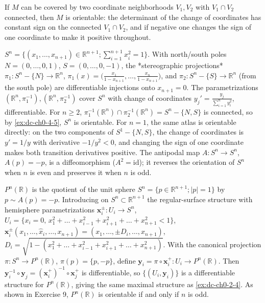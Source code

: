 \begin{example}
  \label{ex:dc-ch0-4-5}
  \notready
  If $M$ can be covered by two coordinate neighborhoods $V_1,V_2$ with
  $V_1\cap V_2$ connected, then $M$ is orientable: the determinant of the change of
  coordinates has constant sign on the connected $V_1\cap V_2$, and if negative one
  changes the sign of one coordinate to make it positive throughout.
\end{example}

\begin{example}
  \label{ex:dc-ch0-4-6}
  \notready
  $S^n=\{(x_1,\dots,x_{n+1})\in\mathbb{R}^{n+1};\sum_{i=1}^{n+1}x_i^2=1\}$. With
  north/south poles $N=(0,\dots,0,1)$, $S=(0,\dots,0,-1)$, the *stereographic
  projections* $\pi_1:S^n-\{N\}\to\mathbb{R}^n$,
  $\pi_1(x)=\big(\frac{x_1}{1-x_{n+1}},\dots,\frac{x_n}{1-x_{n+1}}\big)$, and
  $\pi_2:S^n-\{S\}\to\mathbb{R}^n$ (from the south pole) are differentiable
  injections onto $x_{n+1}=0$. The parametrizations
  $(\mathbb{R}^n,\pi_1^{-1}),(\mathbb{R}^n,\pi_2^{-1})$ cover $S^n$ with change of
  coordinates $y_j'=\frac{y_j}{\sum_{i=1}^n y_i^2}$, differentiable. For $n\geq2$,
  $\pi_1^{-1}(\mathbb{R}^n)\cap\pi_2^{-1}(\mathbb{R}^n)=S^n-\{N,S\}$ is connected,
  so by \cref{ex:dc-ch0-4-5}, $S^n$ is orientable. For $n=1$, the same atlas is
  orientable directly: on the two components of $S^1-\{N,S\}$, the change of
  coordinates is $y'=1/y$ with derivative $-1/y^2<0$, and changing the sign of one
  coordinate makes both transition derivatives positive. The antipodal map
  $A:S^n\to S^n$, $A(p)=-p$, is a diffeomorphism ($A^2=\mathrm{id}$); it reverses the
  orientation of $S^n$ when $n$ is even and preserves it when $n$ is odd.
\end{example}

\begin{example}
  \label{ex:dc-ch0-4-7}
  \notready
  $P^n(\mathbb{R})$ is the quotient of the unit sphere $S^n=\{p\in\mathbb{R}^{n+1};
  |p|=1\}$ by $p\sim A(p)=-p$. Introducing on $S^n\subset\mathbb{R}^{n+1}$ the
  regular-surface structure with hemisphere parametrizations
  $\mathbf{x}_i^{\pm}:U_i\to S^n$,
  $U_i=\{x_i=0,\,x_1^2+\dots+x_{i-1}^2+x_{i+1}^2+\dots+x_{n+1}^2<1\}$,
  $\mathbf{x}_i^{\pm}(x_1,\dots,\hat x_i,\dots,x_{n+1})=(x_1,\dots,\pm D_i,\dots,x_{n+1})$,
  $D_i=\sqrt{1-(x_1^2+\dots+x_{i-1}^2+x_{i+1}^2+\dots+x_{n+1}^2)}$. With the
  canonical projection $\pi:S^n\to P^n(\mathbb{R})$, $\pi(p)=\{p,-p\}$, define
  $\mathbf{y}_i=\pi\circ\mathbf{x}_i^+:U_i\to P^n(\mathbb{R})$. Then
  $\mathbf{y}_i^{-1}\circ\mathbf{y}_j=(\mathbf{x}_i^+)^{-1}\circ\mathbf{x}_j^+$ is
  differentiable, so $\{(U_i,\mathbf{y}_i)\}$ is a differentiable structure for
  $P^n(\mathbb{R})$, giving the same maximal structure as \cref{ex:dc-ch0-2-4}. As shown in
  Exercise 9, $P^n(\mathbb{R})$ is orientable if and only if $n$ is odd.
\end{example}

